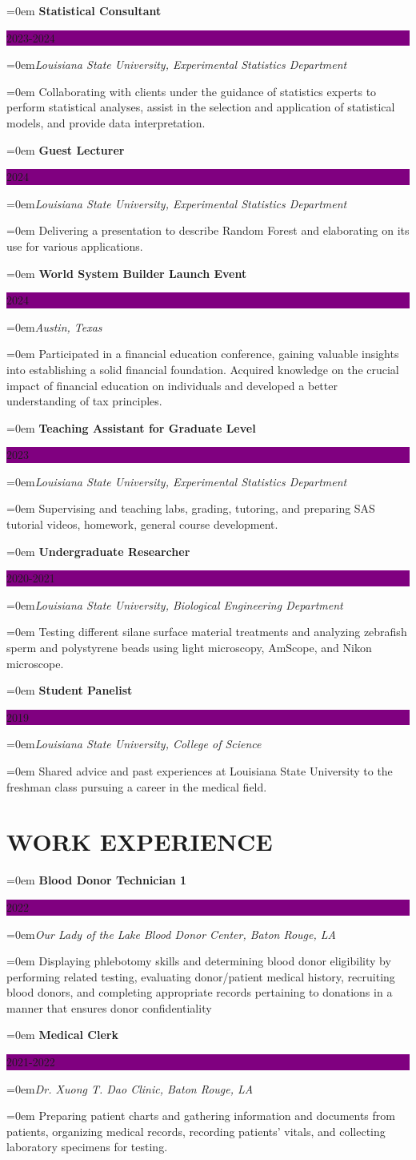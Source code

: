 \documentclass[paper=a4,fontsize=11pt]{scrartcl}
\newcommand{\NewPart}[1]{\section*{\uppercase{#1}}}
\newcommand{\DetailEntry}[4]{
		\noindent \hangindent=0em\hangafter=0 \textbf{#1} \hfill 	%
		\colorbox{Purple}{%
			\parbox{10em}{%
			\hfill\color{White}#2}} \par						%
		\vspace{0.2em}
		\noindent \hangindent=0em\hangafter=0\textit{#3} \par		%
		\noindent\hangindent=0em\hangafter=0 \small #4 			%
		\normalsize \par}
\begin{document}
\DetailEntry{Statistical Consultant}{2023-2024}{Louisiana State University, Experimental Statistics Department}{Collaborating with clients under the guidance of statistics experts to perform statistical analyses, assist in the selection and application of statistical models, and provide data interpretation.}

\DetailEntry{Guest Lecturer}{2024}{Louisiana State University, Experimental Statistics Department}{Delivering a presentation to describe Random Forest and elaborating on its use for various applications.}

\DetailEntry{World System Builder Launch Event}{2024}{Austin, Texas}{Participated in a financial education conference, gaining valuable insights into establishing a solid financial foundation. Acquired knowledge on the crucial impact of financial education on individuals and developed a better understanding of tax principles.}

\DetailEntry{Teaching Assistant for Graduate Level}{2023}{Louisiana State University, Experimental Statistics Department}{Supervising and teaching labs, grading, tutoring, and preparing SAS tutorial videos, homework, general course development.}

\DetailEntry{Undergraduate Researcher}{2020-2021}{Louisiana State University, Biological Engineering Department}{Testing different silane surface material treatments and analyzing zebrafish sperm and polystyrene beads using light microscopy, AmScope, and 
Nikon microscope.}

\DetailEntry{Student Panelist}{2019}{Louisiana State University, College of Science}{Shared advice and past experiences at Louisiana State University to the freshman class pursuing a career in the medical field.}

\NewPart{Work Experience}

\DetailEntry{Blood Donor Technician 1
}{2022}{Our Lady of the Lake Blood Donor Center, Baton Rouge, LA}{Displaying phlebotomy skills and determining blood donor eligibility by performing related testing, evaluating donor/patient medical history, recruiting blood donors, and completing appropriate records pertaining to donations in a manner that ensures donor confidentiality}

\DetailEntry{Medical Clerk}{2021-2022}{Dr. Xuong T. Dao Clinic, Baton Rouge, LA}{Preparing patient charts and gathering information and documents from patients, organizing medical records, recording patients' vitals, and collecting laboratory specimens for testing.}
\end{document}

